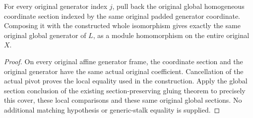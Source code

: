 \begin{theorem}
\label{thm:general-generated-line-actual-original-whole-twist-sections}
\leanok
For every original generator index $j$, pull back the original global
homogeneous coordinate section indexed by the same original padded
generator coordinate. Composing it with the constructed whole
isomorphism gives exactly the same original global generator of $L$,
as a module homomorphism on the entire original $X$.
\end{theorem}
\begin{proof}
On every original affine generator frame, the coordinate section and
the original generator have the same actual original coefficient.
Cancellation of the actual pivot proves the local equality used in
the construction. Apply the global section conclusion of the existing
section-preserving gluing theorem to precisely this cover, these local
comparisons and these same original global sections. No additional
matching hypothesis or generic-stalk equality is supplied.
\end{proof}
